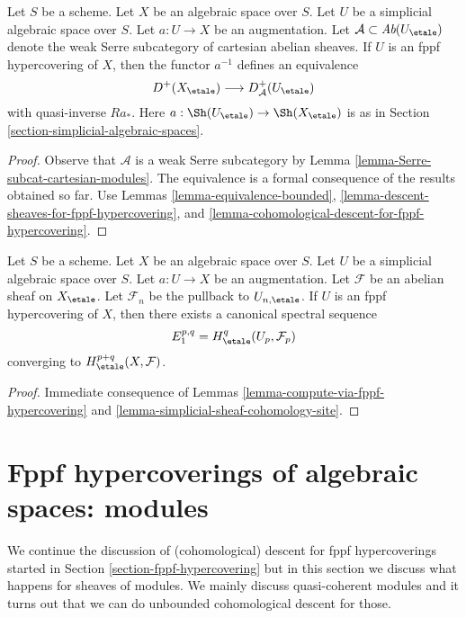 \begin{lemma}
\label{lemma-fppf-hypercovering-equivalence-bounded}
Let $S$ be a scheme. Let $X$ be an algebraic space over $S$.
Let $U$ be a simplicial algebraic space over $S$. Let $a : U \to X$
be an augmentation.
Let $\mathcal{A} \subset \textit{Ab}(U_\etale)$
denote the weak Serre subcategory of cartesian abelian sheaves.
If $U$ is an fppf hypercovering of $X$, then
the functor $a^{-1}$ defines an equivalence
$$
D^+(X_\etale) \longrightarrow D_\mathcal{A}^+(U_\etale)
$$
with quasi-inverse $Ra_*$. Here $a : \Sh(U_\etale) \to \Sh(X_\etale)$
is as in Section \ref{section-simplicial-algebraic-spaces}.
\end{lemma}

\begin{proof}
Observe that $\mathcal{A}$ is a weak Serre subcategory by
Lemma \ref{lemma-Serre-subcat-cartesian-modules}.
The equivalence is a
formal consequence of the results obtained so far. Use
Lemmas \ref{lemma-equivalence-bounded},
\ref{lemma-descent-sheaves-for-fppf-hypercovering}, and
\ref{lemma-cohomological-descent-for-fppf-hypercovering}.
\end{proof}

\begin{lemma}
\label{lemma-spectral-sequence-fppf-hypercovering}
Let $S$ be a scheme. Let $X$ be an algebraic space over $S$.
Let $U$ be a simplicial algebraic space over $S$. Let $a : U \to X$
be an augmentation. Let $\mathcal{F}$ be an abelian sheaf
on $X_\etale$. Let $\mathcal{F}_n$ be the pullback to $U_{n, \etale}$.
If $U$ is an fppf hypercovering of $X$, then
there exists a canonical spectral sequence
$$
E_1^{p, q} = H^q_\etale(U_p, \mathcal{F}_p)
$$
converging to $H^{p + q}_\etale(X, \mathcal{F})$.
\end{lemma}

\begin{proof}
Immediate consequence of Lemmas \ref{lemma-compute-via-fppf-hypercovering}
and \ref{lemma-simplicial-sheaf-cohomology-site}.
\end{proof}








\section{Fppf hypercoverings of algebraic spaces: modules}
\label{section-fppf-hypercovering-modules}

\noindent
We continue the discussion of (cohomological) descent for fppf hypercoverings
started in Section \ref{section-fppf-hypercovering}
but in this section we discuss what happens for sheaves of modules.
We mainly discuss quasi-coherent modules and it turns out that
we can do unbounded cohomological descent for those.

